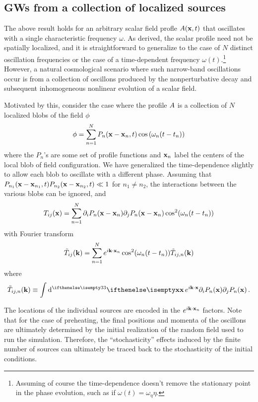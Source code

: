 \documentclass{revtex4}
\begin{document}
\subsection{GWs from a collection of localized sources}
The above result holds for an arbitrary scalar field profle $A({\bf x},t)$ that oscillates with a single characteristic frequency $\omega$.
As derived, the scalar profile need not be spatially localized, and it is straightforward to generalize to the case of $N$ distinct oscillation frequencies or the case of a time-dependent frequency $\omega(t)$.\footnote{Assuming of course the time-dependence doesn't remove the stationary point in the phase evolution, such as if $\omega(t) = \omega_\eta\eta$.}
However, a natural cosmological scenario where such narrow-band oscillations occur is from a collection of oscillons produced by the nonperturbative decay and subsequent inhomogeneous nonlinear evolution of a scalar field.

Motivated by this, consider the case where the profile $A$ is a collection of $N$ localized blobs of the field $\phi$
\begin{equation}
  \phi = \sum_{n=1}^{N} P_n({\bf x-x}_n,t)\cos\left(\omega_n(t-t_n)\right)
\end{equation}
where the $P_n$'s are some set of profile functions and ${\bf x}_n$ label the centers of the local blob of field configuration.
We have generalized the time-dependence slightly to allow each blob to oscillate with a different phase.
Assuming that $P_{n_1}({\bf x-x}_{n_1},t)P_{n_{2}}({\bf x - x}_{n_2},t) \ll 1$ for $n_1 \neq n_2$, the interactions between the various blobs can be ignored, and
\begin{equation}
  T_{ij}({\bf x}) = \sum_{n=1}^N\partial_iP_n({\bf x-x}_n)\partial_jP_n({\bf x-x}_n)\cos^2(\omega_n(t-t_n))
\end{equation}
with Fourier transform
\begin{equation}
  \tilde{T}_{ij}({\bf k}) = \sum_{n=1}^Ne^{i{\bf k}\cdot{\bf x}_n}\cos^2(\omega_n(t-t_n))\tilde{T}_{ij,n}({\bf k})
\end{equation}
where
\begin{equation}
  \tilde{T}_{ij,n}(\kvec) \equiv \int \ud[3]{\xvec}e^{i\kvec\cdot\xvec}\partial_iP_n(\xvec)\partial_jP_n(\xvec) \, .
\end{equation}

The locations of the individual sources are encoded in the $e^{i{\bf k}\cdot{\bf x}_n}$ factors.
Note that for the case of preheating, the final positions and momenta of the oscillons are ultimately determined by the initial realization of the random field used to run the simulation.
Therefore, the ``stochasticity'' effects induced by the finite number of sources can ultimately be traced back to the stochasticity of the initial conditions.
\end{document}
